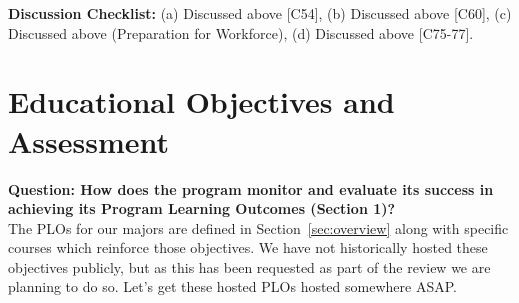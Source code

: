 \documentclass[12pt]{article}
\begin{document}
\noindent
{\bf Discussion Checklist:} (a) Discussed above [C54], (b) Discussed
above [C60], (c) Discussed above (Preparation for Workforce), (d)
Discussed above [C75-77].

\newpage
\section{Educational Objectives and Assessment}

{\bf Question: How does the program monitor and evaluate its success
  in achieving its Program Learning Outcomes (Section 1)?}\\[3pt]



\noindent
The PLOs for our majors are defined in Section~\ref{sec:overview}
along with specific courses which reinforce those objectives.  We have
not historically hosted these objectives publicly, but as this has
been requested as part of the review we are planning to do
so. {\color{red} Let's get these hosted PLOs hosted somewhere ASAP.}
\end{document}
